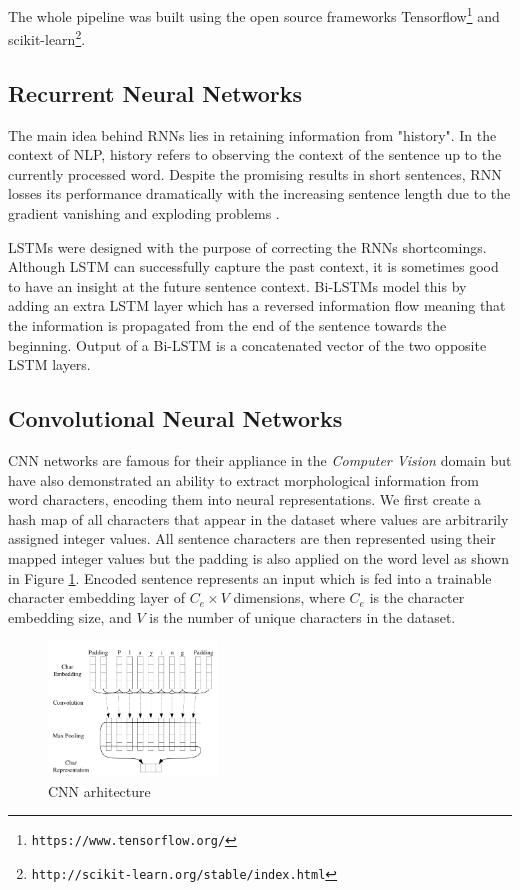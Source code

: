 \documentclass[10pt, a4paper]{article}
\begin{document}
The whole pipeline was  built using the open source frameworks
Tensorflow\citep{tensorflow}\footnote{\texttt{https://www.tensorflow.org/}}
and
scikit-learn\citep{scikit}\footnote{\texttt{http://scikit-learn.org/stable/index.html}}.

\subsection{Recurrent Neural Networks}

The main idea behind RNNs lies in retaining information from "history". In the context of NLP, history refers to observing the context of the sentence up to the currently processed word. Despite the promising results in short sentences, RNN losses its performance dramatically with the increasing sentence length due to the gradient vanishing \cite{bengio1994learning} and exploding problems \cite{pascanu2013difficulty}.

LSTMs were designed with the purpose of correcting the RNNs shortcomings. Although LSTM can successfully capture the past context, it is sometimes good to have an insight at the future sentence context. Bi-LSTMs model this by adding an extra LSTM layer which has a reversed information flow meaning that the information is propagated from the end of the sentence towards the beginning. Output of a Bi-LSTM is a concatenated vector of the two opposite LSTM layers.

\subsection{Convolutional Neural Networks}

CNN networks are famous for their appliance in the \emph{Computer Vision} domain but have also demonstrated an ability to extract morphological information from word characters, encoding them into neural representations. We first create a hash map of all characters that appear in the dataset where values are arbitrarily assigned integer values. All sentence characters are then represented using their mapped integer values but the padding is also applied on the word level as shown in Figure \ref{fig:cnn_embed}. Encoded sentence represents an input which is fed into a trainable character embedding layer of $C_e \times V$ dimensions, where $C_e$ is the character embedding size, and $V$ is the number of unique characters in the dataset.

\begin{figure}
  \caption{CNN arhitecture}
  \label{fig:cnn_embed}
  \centering
    \includegraphics[width=0.4\textwidth]{imgs/cnn_embed.png}
\end{figure}
\end{document}
